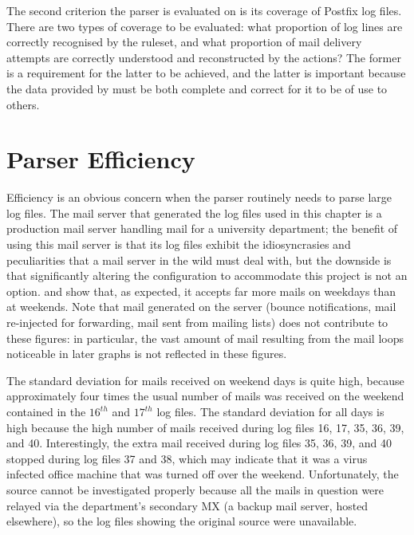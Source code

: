 The second criterion the parser is evaluated on is its coverage of Postfix
log files.  There are two types of coverage to be evaluated: what
proportion of log lines are correctly recognised by the ruleset, and what
proportion of mail delivery attempts are correctly understood and
reconstructed by the actions?  The former is a requirement for the latter
to be achieved, and the latter is important because the data provided by
\parsername{} must be both complete and correct for it to be of use to
others.

\section{Parser Efficiency}

\label{parser efficiency}

Efficiency is an obvious concern when the parser routinely needs to parse
large log files.  The mail server that generated the \numberOFlogFILES{}
log files used in this chapter is a production mail server handling mail
for a university department; the benefit of using this mail server is that
its log files exhibit the idiosyncrasies and peculiarities that a mail
server in the wild must deal with, but the downside is that significantly
altering the configuration to accommodate this project is not an option.
 and  show that, as expected, it accepts far more mails on
weekdays than at weekends.  Note that mail generated on the server (bounce
notifications, mail re-injected for forwarding, mail sent from mailing
lists) does not contribute to these figures: in particular, the vast amount
of mail resulting from the mail loops noticeable in later graphs is not
reflected in these figures.

The standard deviation for mails received on weekend days is
quite high, because approximately four times the usual number of mails was
received on the weekend contained in the $16^{th}$ and $17^{th}$ log files.
The standard deviation for all days is high because the high number of
mails received during log files 16, 17, 35, 36, 39, and 40.  Interestingly,
the extra mail received during log files 35, 36, 39, and 40 stopped during
log files 37 and 38, which may indicate that it was a virus infected office
machine that was turned off over the weekend.  Unfortunately, the source
cannot be investigated properly because all the mails in question were
relayed via the department's secondary MX (a backup mail server, hosted
elsewhere), so the log files showing the original source were unavailable.

